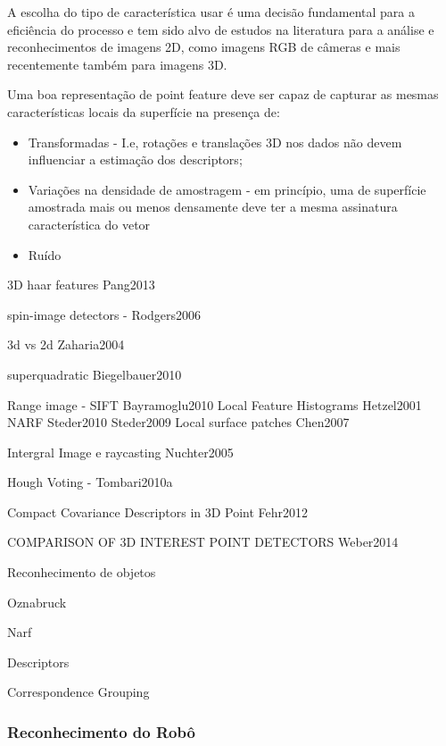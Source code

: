 A escolha do tipo de característica usar é uma decisão fundamental para a
eficiência do processo e tem sido alvo de estudos na literatura para a análise
e reconhecimentos de imagens 2D, como imagens RGB de câmeras e mais recentemente
também para imagens 3D. 

Uma boa representação de point feature deve ser capaz de capturar as mesmas
características locais da superfície na presença de:

\begin{itemize}
  \item Transformadas -  I.e, rotações e translações 3D nos dados não devem influenciar a estimação dos descriptors;
  \item Variações na densidade de amostragem - em princípio, uma de superfície
  amostrada mais ou menos densamente deve ter a mesma assinatura característica do vetor
  \item Ruído
\end{itemize}

3D haar features Pang2013

spin-image detectors - Rodgers2006

3d vs 2d Zaharia2004

superquadratic Biegelbauer2010

Range image - SIFT Bayramoglu2010
			  Local Feature Histograms  Hetzel2001
			  NARF Steder2010 Steder2009
			  Local surface patches Chen2007
			  
Intergral Image e raycasting Nuchter2005

Hough Voting - Tombari2010a
			  
			  

Compact Covariance Descriptors in 3D Point  Fehr2012

COMPARISON OF 3D INTEREST POINT DETECTORS  Weber2014




Reconhecimento de objetos

Oznabruck

Narf

Descriptors

Correspondence Grouping




\subsubsection{Reconhecimento do Robô}